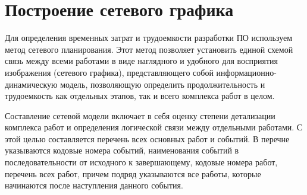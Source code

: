 \section{Построение сетевого графика}
Для определения временных затрат и трудоемкости разработки ПО используем метод сетевого планирования. Этот метод позволяет установить единой схемой связь между всеми работами в виде наглядного и удобного для восприятия изображения (сетевого графика), представляющего собой информационно-динамическую модель, позволяющую определить продолжительность и трудоемкость как отдельных этапов, так и всего комплекса работ в целом.

Составление сетевой модели включает в себя оценку степени детализации комплекса работ и определения логической связи между отдельными работами. С этой целью составляется перечень всех основных работ и событий. В перечне указываются кодовые номера событий, наименования событий в последовательности от исходного к завершающему, кодовые номера работ, перечень всех работ, причем подряд указываются все работы, которые начинаются после наступления данного события.


